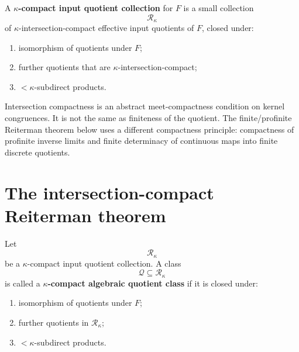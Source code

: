 \begin{definition}
\label{def:reiterman-kappa-compact-input-quotient-collection}
A \textbf{\(\kappa\)-compact input quotient collection} for \(F\) is a small
collection
\[
\mathcal R_\kappa
\]
of \(\kappa\)-intersection-compact effective input quotients of \(F\), closed
under:
\begin{enumerate}
\item isomorphism of quotients under \(F\);
\item further quotients that are \(\kappa\)-intersection-compact;
\item \(<\kappa\)-subdirect products.
\end{enumerate}
\end{definition}

\begin{remark}
\label{rem:reiterman-intersection-compactness-versus-finiteness}
Intersection compactness is an abstract meet-compactness condition on kernel
congruences. It is not the same as finiteness of the quotient. The
finite/profinite Reiterman theorem below uses a different compactness
principle: compactness of profinite inverse limits and finite determinacy of
continuous maps into finite discrete quotients.
\end{remark}

\section{The intersection-compact Reiterman theorem}
\label{sec:reiterman-intersection-compact}

\begin{definition}
\label{def:reiterman-kappa-compact-algebraic-quotient-class}
Let
\[
\mathcal R_\kappa
\]
be a \(\kappa\)-compact input quotient collection. A class
\[
\mathcal Q\subseteq\mathcal R_\kappa
\]
is called a \textbf{\(\kappa\)-compact algebraic quotient class} if it is
closed under:
\begin{enumerate}
\item isomorphism of quotients under \(F\);
\item further quotients in \(\mathcal R_\kappa\);
\item \(<\kappa\)-subdirect products.
\end{enumerate}
\end{definition}

